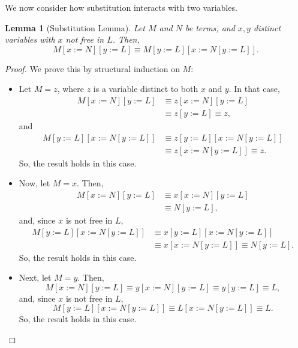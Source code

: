 \documentclass[a4paper, openany]{memoir}
\newtheorem{lemma}[proposition]{Lemma}
\theoremstyle{definition}
\begin{document}
    We now consider how substitution interacts with two variables.
    \begin{lemma}[Substitution Lemma]
        Let $M$ and $N$ be terms, and $x, y$ distinct variables with $x$ not free in $L$. Then,
        \[M[x := N][y := L] \equiv M[y := L][x := N[y := L]].\]
    \end{lemma}
    \begin{proof}
        We prove this by structural induction on $M$:
        \begin{itemize}
            \item Let $M = z$, where $z$ is a variable distinct to both $x$ and $y$. In that case,
            \begin{align*}
                M[x := N][y := L] &\equiv z[x := N][y := L] \\
                &\equiv z[y := L] \equiv z,
            \end{align*}
            and
            \begin{align*}
                M[y:= L][x := N[y := L]] &\equiv z[y:= L][x := N[y := L]] \\
                &\equiv z[x := N[y := L]] \equiv z.
            \end{align*}
            So, the result holds in this case.
            
            \item Now, let $M = x$. Then, 
            \begin{align*}
                M[x := N][y := L] &\equiv x[x := N][y := L] \\
                &\equiv N[y := L],
            \end{align*}
            and, since $x$ is not free in $L$,
            \begin{align*}
                M[y:= L][x := N[y := L]] &\equiv x[y:= L][x := N[y := L]] \\
                &\equiv x[x := N[y := L]] \equiv N[y := L].
            \end{align*}
            So, the result holds in this case.

            \item Next, let $M = y$. Then,
            \[M[x := N][y := L] \equiv y[x := N][y := L] \equiv y[y := L] \equiv L,\]
            and, since $x$ is not free in $L$,
            \[M[y := L][x := N[y := L]] \equiv L[x := N[y := L]] \equiv L.\]
            So, the result holds in this case.


\end{itemize}
\end{proof}
\end{document}
